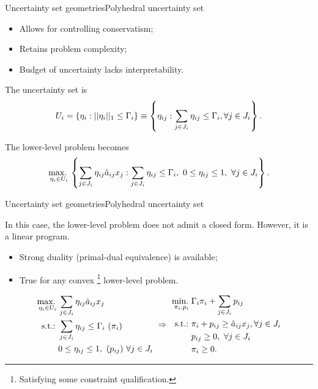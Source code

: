 \begin{frame}{Uncertainty set geometries}{Polyhedral uncertainty set \cite{bertsimas2004price}}

	\begin{itemize}
		\item Allows for controlling conservatism;
		\item Retains problem complexity;
		\item \alert{Budget of uncertainty} lacks interpretability.
	\end{itemize}
	
	The \alert{uncertainty set} is
	$$
		U_i = \left\{ \eta_i : ||\eta_i||_1 \le \Gamma_i \right \} \equiv \left\{ \eta_{ij} : \sum_{j \in J_i} \eta_{ij} \le \Gamma_i, \forall j \in J_i \right \}.
	$$
	
	\pause
	The \alert{lower-level problem} becomes
	\begin{equation*}
		\mathop{\text{max.} \ }_{\eta_i \in U_i}\left\{ \sum_{j \in J_i} \eta_{ij}\hat{a}_{ij}x_j : \sum_{j \in J_i} \eta_{ij} \le \Gamma_i, \ 0 \le \eta_{ij} \le 1, \ \forall j \in J_i \right \}.
	\end{equation*}
	
\end{frame}


\begin{frame}{Uncertainty set geometries}{Polyhedral uncertainty set \cite{bertsimas2004price}}

	In this case, the lower-level problem does not admit a closed form.  However, it is a \alert{linear program}. 
	\vspace{-6pt}
	\begin{itemize}
		\item Strong duality (primal-dual equivalence) is available;
		\item True for any \alert{convex}%
		\footnote{Satisfying some constraint qualification.}
		 lower-level problem.	
	\end{itemize}
	\pause
	\begin{equation*}
		\begin{split}
			\mathop{\text{max.} \ }_{\eta_i \in U_i} & \sum_{j \in J_i} \eta_{ij} \hat{a}_{ij}x_j \\
			 \mathop{\text{s.t.:} \ } & \sum_{j \in J_i} \eta_{ij} \le \Gamma_i \ (\pi_i) \\
			 & 0 \le \eta_{ij} \le 1, \ (p_{ij}) \ \forall j \in J_i
		\end{split}
		\ \Rightarrow \
		\begin{split}
			\mathop{\text{min.} \ }_{\pi_i, p_i} & \Gamma_i\pi_i + \sum_{j \in J_i} p_{ij} \\
			 \mathop{\text{s.t.:} \ } & \pi_i + p_{ij} \ge \hat{a}_{ij}x_j, \forall j \in J_i \\
			 &p_{ij} \ge 0, \ \forall j \in J_i \\
			 &\pi_i \ge 0.
		\end{split}
	\end{equation*}
	
\end{frame}


